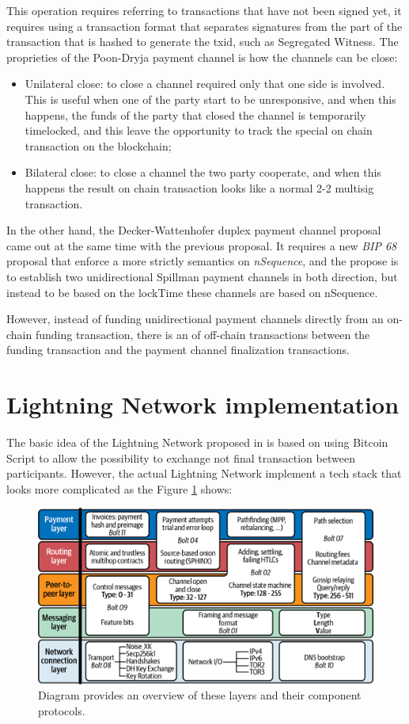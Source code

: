 This operation requires referring to transactions that have not been signed yet, it requires using a transaction
format that separates signatures from the part of the transaction that is hashed to generate the txid, such as Segregated Witness.
The proprieties of the Poon-Dryja payment channel is how the channels can be close:

\begin{itemize}
  \item Unilateral close: to close a channel required only that one side is involved. This is useful when one
        of the party start to be unresponsive, and when this happens, the funds of
        the party that closed the channel is temporarily timelocked, and this leave the opportunity to
        track the special on chain transaction on the blockchain;
  \item Bilateral close: to close a channel the two party cooperate, and when this happens the result
        on chain transaction looks like a normal 2-2 multisig transaction.
\end{itemize}


In the other hand, the Decker-Wattenhofer duplex payment channel proposal came out at the same time with the previous proposal.
It requires a new \emph{BIP 68}\cite{bip68} proposal that enforce a more strictly semantics on \emph{nSequence}, and the propose is to
establish two unidirectional Spillman payment channels in both
direction, but instead to be based on the lockTime these channels are based on nSequence.

However, instead of funding unidirectional payment channels directly from an on-chain funding transaction, there is an  of off-chain transactions between the funding transaction and the payment channel finalization transactions.

\section{Lightning Network implementation}

The basic idea of the Lightning Network proposed in \cite{lightning-network-paper} is based on using Bitcoin Script
to allow the possibility to exchange not final transaction between participants.
However, the actual Lightning Network implement a tech stack that looks more complicated
as the Figure \ref{fig:lightning-stack} shows:

\begin{figure}[h]
  \begin{center}
  \includegraphics[width=0.6\columnwidth]{imgs/mtln_0601.png}
  \end{center}
  \caption{Diagram provides an overview of these layers and their component protocols.}
  \label{fig:lightning-stack}
\end{figure}

